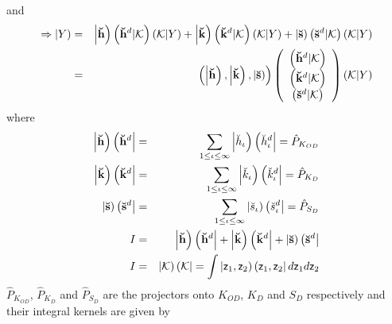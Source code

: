 and 
\begin{eqnarray}
\Rightarrow \left| Y\right) &=&\left| {\bf \breve{h}}\right) \left( {\bf 
\breve{h}}^{d}|{\cal K}\right) \left( {\cal K}|Y\right) +\left| {\bf \breve{k%
}}\right) \left( {\bf \breve{k}}^{d}|{\cal K}\right) \left( {\cal K}%
|Y\right) +\left| {\bf \breve{s}}\right) \left( {\bf \breve{s}}^{d}|{\cal K}%
\right) \left( {\cal K}|Y\right)  \nonumber \\
&=&\left( \left| {\bf \breve{h}}\right) ,\left| {\bf \breve{k}}\right)
,\left| {\bf \breve{s}}\right) \right) \left( 
\begin{array}{c}
\left( {\bf \breve{h}}^{d}|{\cal K}\right) \\ 
\left( {\bf \breve{k}}^{d}|{\cal K}\right) \\ 
\left( {\bf \breve{s}}^{d}|{\cal K}\right)%
\end{array}%
\right) \left( {\cal K}|Y\right)  \label{HtoK}
\end{eqnarray}%
where 
\begin{eqnarray}
\left| {\bf \breve{h}}\right) \left( {\bf \breve{h}}^{d}\right|
&=&\sum_{1\leq \iota \leq \infty }\left| \breve{h}_{\iota }\right) \left( 
\breve{h}_{\iota }^{d}\right| =\hat{P}_{K_{OD}}  \nonumber \\
\left| {\bf \breve{k}}\right) \left( {\bf \breve{k}}^{d}\right|
&=&\sum_{1\leq \iota \leq \infty }\left| \breve{k}_{\iota }\right) \left( 
\breve{k}_{\iota }^{d}\right| =\hat{P}_{K_{D}}  \nonumber \\
\left| {\bf \breve{s}}\right) \left( {\bf \breve{s}}^{d}\right|
&=&\sum_{1\leq \iota \leq \infty }\left| \breve{s}_{\iota }\right) \left( 
\breve{s}_{\iota }^{d}\right| =\hat{P}_{S_{D}}  \nonumber \\
I &=&\left| {\bf \breve{h}}\right) \left( {\bf \breve{h}}^{d}\right| +\left| 
{\bf \breve{k}}\right) \left( {\bf \breve{k}}^{d}\right| +\left| {\bf \breve{%
s}}\right) \left( {\bf \breve{s}}^{d}\right|  \nonumber \\
I &=&\left| {\cal K}\right) \left( {\cal K}\right| =\int \left| {\sf z}_{1},%
{\sf z}_{2}\right) \left( {\sf z}_{1},{\sf z}_{2}\right| d{\sf z}_{1}d{\sf z}%
_{2}
\end{eqnarray}%
$\hat{P}_{K_{OD}}$, $\hat{P}_{K_{D}}$ and $\hat{P}_{S_{D}}$ are the
projectors onto $K_{OD}$, $K_{D}$ and $S_{D}$ respectively and their
integral kernels are given by 
